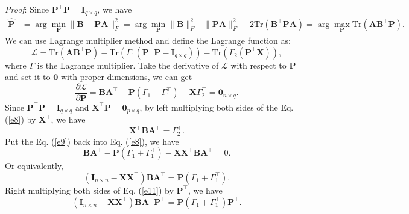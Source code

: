 \documentclass[titlepage,11pt,twoside]{article}
\begin{document}
\emph{Proof}:
Since $\mathbf{P}^{\top}\mathbf{P} = \mathbf{I}_{q\times q}$, we have
\begin{equation}
\begin{split}
\mathbf{\hat{P}}
&
=\arg\min_{\mathbf{P}}\|\mathbf{B}-\mathbf{P}\mathbf{A}\|_{F}^{2}
=\arg\min_{\mathbf{P}}\|\mathbf{B}\|_{F}^{2}+\|\mathbf{P}\mathbf{A}\|_{F}^{2}-2\text{Tr}(\mathbf{B}^{\top}\mathbf{P}\mathbf{A})
=\arg\max_{\mathbf{P}}\text{Tr}(\mathbf{A}\mathbf{B}^{\top}\mathbf{P}).
\end{split}
\end{equation}
We can use Lagrange multiplier method and define the Lagrange function as:
\begin{equation}
\mathcal{L}
=
\text{Tr}(\mathbf{A}\mathbf{B}^{\top}\mathbf{P})
-
\text{Tr}(\Gamma_{1}(\mathbf{P}^{\top}\mathbf{P} - \mathbf{I}_{q\times q}))
-
\text{Tr}(\Gamma_{2}(\mathbf{P}^{\top}\mathbf{X}))
,
\end{equation}
where $\Gamma$ is the Lagrange multiplier. Take the derivative of $\mathcal{L}$ with respect to $\mathbf{P}$ and set it to $\mathbf{0}$ with proper dimensions, we can get
\begin{equation}\label{e8}
\frac{\partial \mathcal{L}}{\partial \mathbf{P}} 
=
\mathbf{B}\mathbf{A}^{\top}
-
\mathbf{P}(\Gamma_{1}+\Gamma_{1}^{\top})
-
\mathbf{X}\Gamma_{2}^{\top}
=
\mathbf{0}_{n\times q}.
\end{equation}
Since $\mathbf{P}^{\top}\mathbf{P}=\mathbf{I}_{q\times q}$ and $\mathbf{X}^{\top}\mathbf{P} = \mathbf{0}_{p\times q}$, by left multiplying both sides of the Eq. (\ref{e8}) by $\mathbf{X}^{\top}$, we have 
\begin{equation}\label{e9}
\mathbf{X}^{\top}\mathbf{B}\mathbf{A}^{\top}
=
\Gamma_{2}^{\top}.
\end{equation}
Put the Eq. (\ref{e9}) back into Eq. (\ref{e8}), we have 
\begin{equation}\label{e10}
\mathbf{B}\mathbf{A}^{\top}
-
\mathbf{P}(\Gamma_{1}+\Gamma_{1}^{\top})
-
\mathbf{X}\mathbf{X}^{\top}\mathbf{B}\mathbf{A}^{\top}
=
0.
\end{equation}
Or equivalently,
\begin{equation}\label{e11}
(\mathbf{I}_{n\times n}-\mathbf{X}\mathbf{X}^{\top})\mathbf{B}\mathbf{A}^{\top}
=
\mathbf{P}(\Gamma_{1}+\Gamma_{1}^{\top}).
\end{equation}
Right multiplying both sides of Eq. (\ref{e11}) by $\mathbf{P}^{\top}$, we have
\begin{equation}
(\mathbf{I}_{n\times n}-\mathbf{X}\mathbf{X}^{\top})\mathbf{B}\mathbf{A}^{\top}\mathbf{P}^{\top}
=
\mathbf{P}(\Gamma_{1}+\Gamma_{1}^{\top})\mathbf{P}^{\top}
.
\end{equation}
\end{document}
